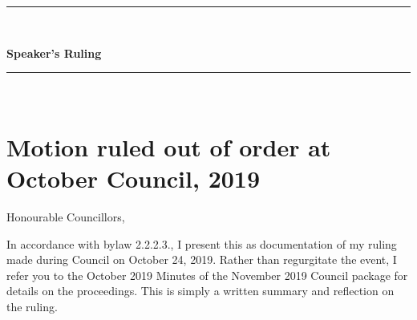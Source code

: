 \begin{center}
\rule{\textwidth}{3.6pt}\\[\baselineskip] %
\begin{Huge}
\textbf{Speaker's Ruling}
\end{Huge}

\rule{\textwidth}{3.6pt}\\[\baselineskip] %

\vspace*{1\baselineskip} %
\end{center}
\section*{Motion ruled out of order at October Council, 2019}

Honourable Councillors,

In accordance with bylaw 2.2.2.3., I present this as documentation of my ruling made during Council on October 24, 2019. Rather than regurgitate the event, I refer you to the October 2019 Minutes of the November 2019 Council package for details on the proceedings.
This is simply a written summary and reflection on the ruling. 

